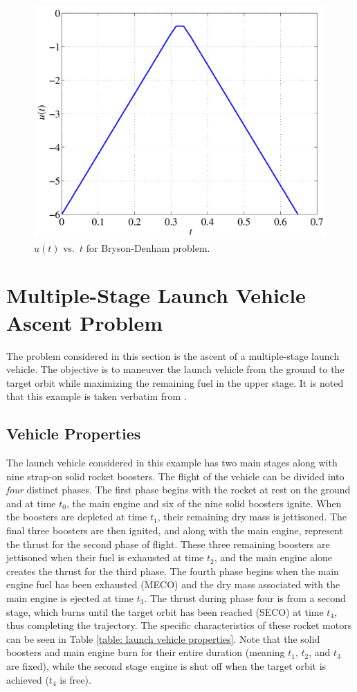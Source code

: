 \documentclass[10pt,final]{report}
\newcounter{example}[chapter]
\begin{document}
\begin{figure}[H]
  \centering
  \includegraphics[height=3.5in]{uvstBrysonDenham.pdf}
  \caption{$u(t)$ vs.~$t$ for Bryson-Denham problem.}
\end{figure}

\section{Multiple-Stage Launch Vehicle Ascent Problem}

The problem considered in this section is the ascent of a
multiple-stage launch vehicle.  The objective is to maneuver the launch
vehicle from the ground to the target orbit while maximizing the remaining
fuel in the upper stage.   It is noted that this example is taken
verbatim from .

\subsection{Vehicle Properties}

The launch vehicle considered in this example has two main stages
along with nine strap-on solid rocket boosters.  The flight of the
vehicle can be divided into {\em four} distinct phases.  The first
phase begins with the rocket at rest on the ground and at time $t_0$,
the main engine and six of the nine solid boosters ignite.  When the
boosters are depleted at time $t_1$, their remaining dry mass is
jettisoned. The final three boosters are then ignited, and along with the
main engine, represent the thrust for the second phase of flight.
These three remaining boosters are jettisoned when their fuel is
exhausted at time $t_2$, and the main engine alone creates the thrust
for the third phase.   The fourth phase begins when the main engine
fuel has been exhausted (MECO) and the dry mass associated with the
main engine is ejected at time $t_3$.   The thrust during phase four
is from a second stage, which burns until the target orbit has been
reached (SECO) at time $t_4$, thus completing the trajectory.  The
specific characteristics of these rocket motors can be seen in Table
\ref{table: launch vehicle properties}.  Note that the solid boosters
and main engine burn for their entire duration (meaning $t_1$, $t_2$,
and $t_3$ are fixed), while the second stage engine is shut off when
the target orbit is achieved ($t_4$ is free).
\end{document}
